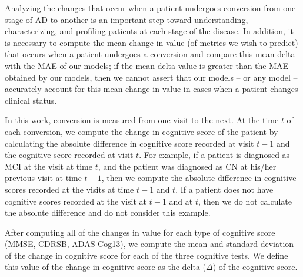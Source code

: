 \documentclass{article}
\begin{document}
Analyzing the changes that occur when a patient undergoes conversion from one stage of AD to another is an important step toward understanding, characterizing, and profiling patients at each stage of the disease. In addition, it is necessary to compute the mean change in value (of metrics we wish to predict) that occurs when a patient undergoes a conversion and compare this mean delta with the MAE of our models; if the mean delta value is greater than the MAE obtained by our models, then we cannot assert that our models -- or any model -- accurately account for this mean change in value in cases when a patient changes clinical status. 

In this work, conversion is measured from one visit to the next. At the time $t$ of each conversion, we compute the change in cognitive score of the patient by calculating the absolute difference in cognitive score recorded at visit $t-1$ and the cognitive score recorded at visit $t$. For example, if a patient is diagnosed as MCI at the visit at time $t$, and the patient was diagnosed as CN at his/her previous visit at time $t-1$, then we compute the absolute difference in cognitive scores recorded at the visits at time $t-1$ and $t$. If a patient does not have cognitive scores recorded at the visit at $t-1$ and at $t$, then we do not calculate the absolute difference and do not consider this example. 

After computing all of the changes in value for each type of cognitive score (MMSE, CDRSB, ADAS-Cog13), we compute the mean and standard deviation of the change in cognitive score for each of the three cognitive tests. We define this value of the change in cognitive score as the delta ($\Delta$) of the cognitive score. 
\end{document}
